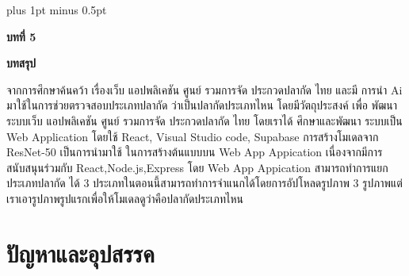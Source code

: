 
\clearpage
\thispagestyle{empty}

\begingroup
\fontsize{16pt}{19.2pt}\selectfont
\justifying
\XeTeXlinebreakskip=0pt plus 1pt minus 0.5pt
\setlength{\parindent}{1.5cm}
\setlength{\parskip}{0pt}

{}
\begin{center}
	{\bfseries\fontsize{18pt}{21.6pt}\selectfont บทที่ 5}
\end{center}

\vspace{\baselineskip}

\begin{center}
	{\bfseries\fontsize{18pt}{21.6pt}\selectfont บทสรุป}
\end{center}

\vspace{\baselineskip}

\indent จากการศึกษาค้นคว้า เรื่องเว็บ แอปพลิเคชัน ศูนย์ รวมการจัด ประกวดปลากัด ไทย และมี
การนำ Ai มาใช้ในการช่วยตรวจสอบประเภทปลากัด ว่าเป็นปลากัดประเภทไหน โดยมีวัตถุประสงค์
เพื่อ พัฒนาระบบเว็บ แอปพลิเคชัน ศูนย์ รวมการจัด ประกวดปลากัด ไทย โดยเราได้ ศึกษาและพัฒนา
ระบบเป็น Web Application โดยใช้ React, Visual Studio code, Supabase
การสร้างโมเดลจาก ResNet-50 เป็นการนำมาใช้ ในการสร้างต้นแบบบน Web App
Appication เนื่องจากมีการสนับสนุนร่วมกับ React,Node.js,Express โดย Web App Appication
สามารถทำการแยกประเภทปลากัด ได้ 3 ประเภทในตอนนี้สามารถทำการจำแนกได้โดยการอัปโหลดรูปภาพ 3 รูปภาพแต่เราเอารูปภาพรูปแรกเพื่อให้โมเดลดูว่าคือปลากัดประเภทไหน

\vspace{\baselineskip}

\section*{ปัญหาและอุปสรรค}

